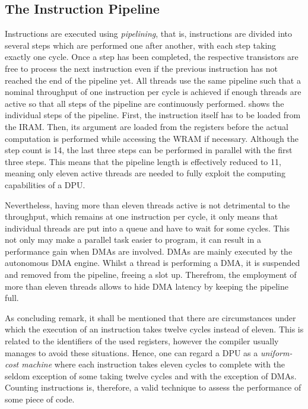 \subsection{The Instruction Pipeline}
\label{sec:prereq:arch:pipeline}

Instructions are executed using \emph{pipelining}, that is, instructions are divided into several steps which are performed one after another, with each step taking exactly one cycle.
Once a step has been completed, the respective transistors are free to process the next instruction even if the previous instruction has not reached the end of the pipeline yet.
All threads use the same pipeline such that a nominal throughput of one instruction per cycle is achieved if enough threads are active so that all steps of the pipeline are continuously performed.
 shows the individual steps of the pipeline.
First, the instruction itself has to be loaded from the \ac{IRAM}.
Then, its argument are loaded from the registers before the actual computation is performed while accessing the \ac{WRAM} if necessary.
Although the step count is 14, the last three steps can be performed in parallel with the first three steps.
This means that the pipeline length is effectively reduced to 11, meaning only eleven active threads are needed to fully exploit the computing capabilities of a DPU.

Nevertheless, having more than eleven threads active is not detrimental to the throughput, which remains at one instruction per cycle, it only means that individual threads are put into a queue and have to wait for some cycles.
This not only may make a parallel task easier to program, it can result in a performance gain when \acp{DMA} are involved.
\Acp{DMA} are mainly executed by the autonomous \ac{DMA} engine.
Whilst a thread is performing a \ac{DMA}, it is suspended and removed from the pipeline, freeing a slot up.
Therefrom, the employment of more than eleven threads allows to hide \ac{DMA} latency by keeping the pipeline full.

As concluding remark, it shall be mentioned that there are circumstances under which the execution of an instruction takes twelve cycles instead of eleven.
This is related to the identifiers of the used registers, however the compiler usually manages to avoid these situations.
Hence, one can regard a \ac{DPU} as a \emph{uniform-cost machine} where each instruction takes eleven cycles to complete with the seldom exception of some taking twelve cycles and with the exception of \acp{DMA}.
Counting instructions is, therefore, a valid technique to assess the performance of some piece of code.

